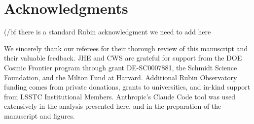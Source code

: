 \documentclass[twocolumn]{aastex631}
\begin{document}
\section{Acknowledgments}
({/bf there is a standard Rubin acknowledgment we need to add here}

We sincerely thank our referees for their thorough review of this manuscript and their valuable feedback.
JHE and CWS are grateful for support from the DOE Cosmic Frontier program through grant DE-SC0007881, the Schmidt Science Foundation, and the Milton Fund at Harvard.  Additional Rubin Observatory funding comes from private donations, grants to universities, and in-kind support from LSSTC Institutional Members. Anthropic's Claude Code tool was used extensively in the analysis presented here, and in the preparation of the manuscript and figures. 




\end{document}
